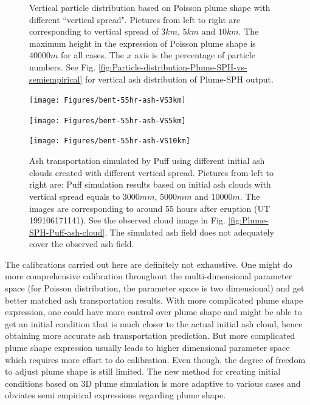\documentclass[draft,linenumbers]{agujournal2019}
\begin{document}
\begin{figure}[!htb]
\begin{minipage}{.325 \textwidth}
\end{minipage}%
\caption{Vertical particle distribution based on Poisson plume shape with different ``vertical spread". Pictures from left to right are corresponding to vertical spread of $3km$, $5km$ and $10 km$. The maximum height in the expression of Poisson plume shape is $40000 m$ for all cases. The $x$ axis is the percentage of particle numbers. See Fig. \ref{fig:Particle-distribution-Plume-SPH-vs-semiempirical} for vertical ash distribution of Plume-SPH output.}
\label{fig:poisson-vertical-spread}
\end{figure}

\begin{figure}[!htb]
\centering
\begin{minipage}{.325\textwidth}
\centering
\texttt{[image: Figures/bent-55hr-ash-VS3km]}
\end{minipage}%
\begin{minipage}{.325 \textwidth}
\centering
\texttt{[image: Figures/bent-55hr-ash-VS5km]}
\end{minipage}%
\begin{minipage}{.325 \textwidth}
\centering
\texttt{[image: Figures/bent-55hr-ash-VS10km]}
\end{minipage}%
\caption{Ash transportation simulated by Puff using different initial ash clouds created with different vertical spread. Pictures from left to right are: Puff simulation results based on initial ash clouds with vertical spread equals to $3000m m$, $5000m m$ and $10000 m$. The images are corresponding to around 55 hours after eruption (UT 199106171141). See the observed cloud image in Fig. \ref{fig:Plume-SPH-Puff-ash-cloud}. The simulated ash field does not adequately cover the observed ash field.}
\label{fig:Various-vertical-spread-Pinatubo-ash-cloud}
\end{figure}

The calibrations carried out here are definitely not exhaustive. One might do more comprehensive calibration throughout the multi-dimensional parameter space (for Poisson distribution, the parameter space is two dimensional) and get better matched ash transportation results. With more complicated plume shape expression, one could have more control over plume shape and might be able to get an initial condition that is much closer to the actual initial ash cloud, hence obtaining more accurate ash transportation prediction. But more complicated plume shape expression usually leads to higher dimensional parameter space which requires more effort to do calibration. Even though, the degree of freedom to adjust plume shape is still limited. The new method for creating initial conditions based on 3D plume simulation is more adaptive to various cases and obviates semi empirical expressions regarding plume shape.
\end{document}
